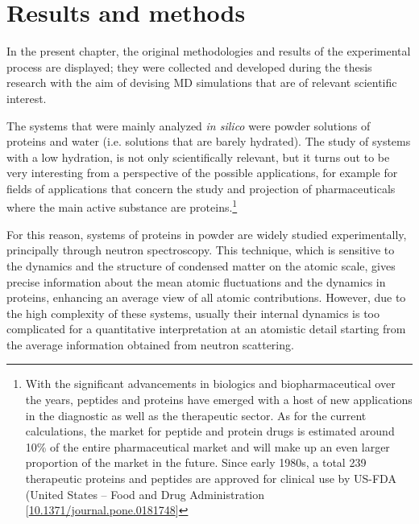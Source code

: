 \chapter{Results and methods}
In the present chapter, the original methodologies and results of the experimental process are displayed; they were collected and developed during the thesis research with the aim of devising MD simulations that are of relevant scientific interest. 

The systems that were mainly analyzed \textit{in silico} were powder solutions of proteins and water (i.e. solutions that are barely hydrated). The study of systems with a low hydration, is not only scientifically relevant, but it turns out to be very interesting from a perspective of the possible applications, for example for fields of applications that concern the study and projection of pharmaceuticals where the main active substance are proteins.\footnote{With the significant advancements in biologics and biopharmaceutical over the years, peptides and proteins have emerged with a host of new applications in the diagnostic as well as the therapeutic sector. As for the current calculations, the market for peptide and protein drugs is estimated around 10\% of the entire pharmaceutical market and will make up an even larger proportion of the market in the future. Since early 1980s, a total 239 therapeutic proteins and peptides are approved for clinical use by US-FDA (United States -- Food and Drug Administration [\url{10.1371/journal.pone.0181748}]}
 
For this reason, systems of proteins in powder are widely studied experimentally, principally through neutron spectroscopy. 
This technique, which is sensitive to the dynamics and the structure of condensed matter on the atomic scale, gives precise information about the mean atomic fluctuations and the dynamics in proteins, enhancing an average view of all atomic contributions.
However, due to the high complexity of these systems, usually their internal dynamics is too complicated for a quantitative interpretation at an atomistic detail starting from the average information obtained from neutron scattering.


